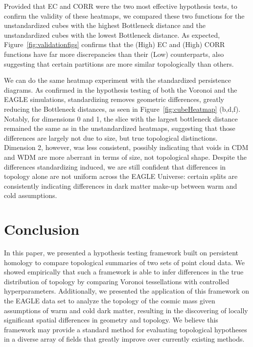\documentclass[12pt]{article}
\newcommand{\figref}[1]{Figure~\ref{#1}}
\begin{document}
Provided that EC and CORR were the two most effective hypothesis tests, to confirm the validity of these heatmaps, we compared these two functions for the unstandardized cubes with the highest Bottleneck distance and the unstandardized cubes with the lowest Bottleneck distance. As expected, \figref{fig:validationfigs} confirms that the (High) EC and (High) CORR functions have far more discrepancies than their (Low) counterparts, also suggesting that certain partitions are more similar topologically than others.

We can do the same heatmap experiment with the standardized persistence diagrams. As confirmed in the hypothesis testing of both the Voronoi and the EAGLE simulations, standardizing removes geometric differences, greatly reducing the Bottleneck distances, as seen in \figref{fig:cubeHeatmap} (b,d,f). Notably, for dimensions 0 and 1, the slice with the largest bottleneck distance remained the same as in the unstandardized heatmaps, suggesting that those differences are largely not due to size, but true topological distinctions. Dimension 2, however, was less consistent, possibly indicating that voids in CDM and WDM are more aberrant in terms of size, not topological shape. Despite the differences standardizing induced, we are still confident that differences in topology alone are not uniform across the EAGLE Universe: certain splits are consistently indicating differences in dark matter make-up between warm and cold assumptions.


\section{Conclusion}
\label{sec:conc}
In this paper, we presented a hypothesis testing framework built on persistent homology to compare topological summaries of two sets of point cloud data. We showed empirically that such a framework is able to infer differences in the true distribution of topology by comparing Voronoi tessellations with controlled hyperparameters. Additionally, we presented the application of this framework on the EAGLE data set to analyze the topology of the cosmic mass given assumptions of warm and cold dark matter, resulting in the discovering of locally significant spatial differences in geometry and topology. We believe this framework may provide a standard method for evaluating topological hypotheses in a diverse array of fields that greatly improve over currently existing methods.
\end{document}
